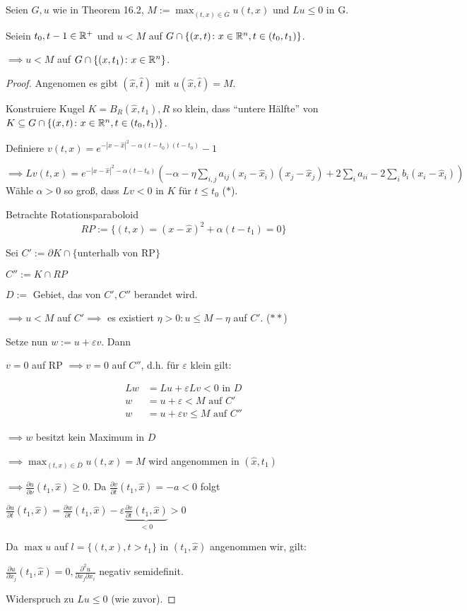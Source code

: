 Seien $G, u$ wie in Theorem 16.2, $M := \max_{(t,x) \in \overline G} u(t,x)$ und $L u \leq 0$ in G.

Seiein $t_0, t-1 \in \mathbb{R}^+$ und $u < M$ auf $G \cap \{(x,t) \colon x \in \mathbb{R}^n, t \in (t_0, t_1) \}$.

$\implies u < M$ auf $G \cap \{(x, t_1) \colon x \in \mathbb{R}^n\}$.

\begin{proof}
  Angenomen es gibt $(\hat x, \hat t)$ mit $u(\hat x, \hat t) = M$.

  Konstruiere Kugel $K = B_R(\hat x, t_1), R$ so klein, dass ``untere Hälfte'' von $K \subseteq G \cap \{(x,t) \colon x \in \mathbb{R}^n, t \in (t_0, t_1)\}$.

  Definiere $v(t,x) = e^{-|x - \hat x|^2 - \alpha(t - t_0)(t - t_0)} - 1$

  $\implies Lv(t,x) = e^{-|x - \hat x|^2 - \alpha(t - t_0)}(-\alpha - \eta \sum_{i,j} a_{ij}(x_i - \hat x_i)(x_j - \hat x_j) + 2 \sum_i a_{ii} - 2\sum_i b_i(x_i - \hat x_i))$
   Wähle $\alpha > 0$ so groß, dass $Lv < 0$ in $K$ für $t \leq t_0$ ($\ast$).

   Betrachte Rotationsparaboloid
   $$
   RP := \{(t,x) = (x - \hat x)^2 + \alpha (t - t_1) = 0\}
   $$

   Sei $C' := \partial K \cap \{ \text{unterhalb von RP}\} $

   $C'' := K \cap RP$

   $D := $ Gebiet, das von $C', C''$ berandet wird.

   $\implies u < M$ auf $C' \implies $ es existiert $\eta > 0 \colon u \leq M - \eta$ auf $C'$. ($\ast\ast$)

   Setze nun $w:= u + \varepsilon v$. Dann

   $v = 0$ auf RP $\implies  v = 0$ auf $C''$, d.h. für $\varepsilon$ klein gilt:

   \begin{align*}
     Lw &= Lu + \varepsilon Lv < 0 \text{ in } D \\
     w &= u + \varepsilon < M \text{ auf } C' \\
     w &= u + \varepsilon v \leq M \text{ auf } C''
   \end{align*}

   $\implies w$ besitzt kein Maximum in $D$

   $\implies \max_{(t,x) \in \overline D} u(t,x) = M$ wird angenommen in $(\hat x, t_1)$

   $\implies \frac{\partial u}{\partial \nu} (t_1, \hat x) \geq 0$. Da $\frac{\partial v}{\partial t}(t_1, \hat x) = -a < 0$ folgt

   $\frac{\partial u}{\partial t}(t_1, \hat x) = \frac{\partial w}{\partial t}(t_1, \hat x) - \varepsilon \underbrace{\frac{\partial v}{\partial t}(t_1, \hat x)}_{< 0} > 0$

   Da $\max u$ auf $l = \{(t,x), t > t_1\}$ in $(t_1, \hat x)$ angenommen wir, gilt:

   $\frac{\partial u}{\partial x_j}(t_1, \hat x) = 0, \frac{\partial^2 u}{\partial x_j \partial x_i}$ negativ semidefinit.

   Widerspruch zu $Lu \leq 0$ (wie zuvor).
 \end{proof}

